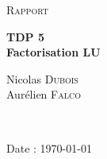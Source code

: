 \documentclass[12pt]{article}
\begin{document}
\begin{titlepage}
\begin{center}
\vspace*{3cm}
\textsc{\Large Rapport}\\[1.5cm]
\vspace{1cm}

	{ \huge \bfseries TDP 5\\[0.4cm] }
	{ \bfseries Factorisation LU\\[0.4cm] }

\vspace{3cm}

	\begin{minipage}{0.5\textwidth}
	    \begin{center} \large
	             Nicolas \textsc{Dubois}\\
	             Aurélien \textsc{Falco}\\
	    \end{center}
	\end{minipage}
	\\[2cm]
    \end{center}

\vspace*{4cm}
\begin{flushright}Date : \today\end{flushright}
\end{titlepage}





\end{document}

